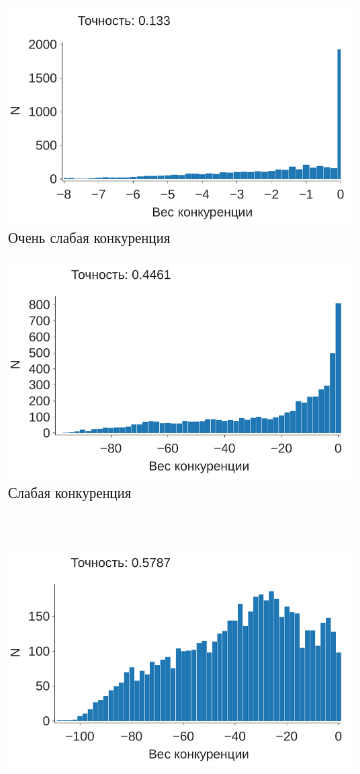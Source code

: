 \documentclass[a4paper]{article}
\begin{document}
\begin{figure}
\centering
\begin{subfigure}{0.45\textwidth}
    \includegraphics[width=\textwidth,keepaspectratio=true]{competition_distribution_worst_ru.pdf}
    \caption{Очень слабая конкуренция}
\end{subfigure}
\begin{subfigure}{0.45\textwidth}
    \includegraphics[width=\textwidth,keepaspectratio=true]{competition_distribution_medium_bad_ru.pdf}
    \caption{Слабая конкуренция}
\end{subfigure}
\\
\begin{subfigure}{0.45\textwidth}
    \includegraphics[width=\textwidth,keepaspectratio=true]{competition_distribution_medium_good_ru.pdf}

\end{subfigure}
\end{figure}
\end{document}
